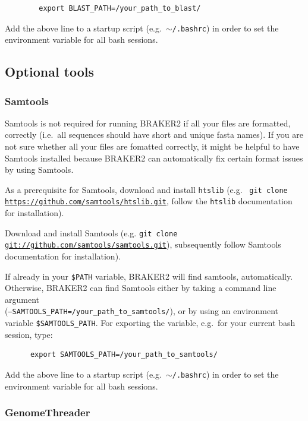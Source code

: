 \documentclass[a4paper,10pt]{report}
\begin{document}
    \begin{verbatim}
        export BLAST_PATH=/your_path_to_blast/ 
    \end{verbatim} 

    Add the above line to a startup script (e.g.~\texttt{$\sim$/.bashrc}) in order to set the environment variable for all bash sessions.




\subsection{Optional tools}

\subsubsection{Samtools}

Samtools is not required for running BRAKER2 if all your files are formatted, correctly (i.e.~all sequences should have short and unique fasta names). If you are not sure
      whether all your files are fomatted correctly, it might be helpful to have Samtools
      installed because BRAKER2 can automatically fix certain format issues by using Samtools. 

      As a prerequisite for Samtools, download and install \texttt{htslib} (e.g.~ 
      \texttt{git clone \url{https://github.com/samtools/htslib.git}}, follow the \texttt{htslib} documentation for 
      installation).

      Download and install Samtools (e.g. \texttt{git clone \url{git://github.com/samtools/samtools.git}}), 
      subsequently follow Samtools documentation for installation).    

      If already in your \texttt{\$PATH} variable, BRAKER2 will find samtools, automatically. Otherwise, BRAKER2 can find Samtools either by taking a command line argument\\ (\texttt{--SAMTOOLS\_PATH=/your\_path\_to\_samtools/}), or by using an environment variable \texttt{\$SAMTOOLS\_PATH}. For exporting the variable, e.g.~for your current bash session, type:

    \begin{verbatim}
      export SAMTOOLS_PATH=/your_path_to_samtools/
    \end{verbatim}
    
        Add the above line to a startup script (e.g.~\texttt{$\sim$/.bashrc}) in order to set the environment variable for all bash sessions.
\subsubsection{GenomeThreader}
\end{document}
